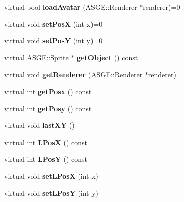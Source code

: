 \begin{DoxyCompactItemize}
\item 
\mbox{\label{class_object_a44005e232ebb49ea093dbf9fb909ef02}} 
virtual bool {\bfseries load\+Avatar} (A\+S\+G\+E\+::\+Renderer $\ast$renderer)=0
\item 
\mbox{\label{class_object_a81f5a535d599983bf95089b5e0837c94}} 
virtual void {\bfseries set\+PosX} (int x)=0
\item 
\mbox{\label{class_object_a9684d0c1fd87f92b71423f3615c830db}} 
virtual void {\bfseries set\+PosY} (int y)=0
\item 
\mbox{\label{class_object_a348ce852463ea723048518d2bd667d09}} 
virtual A\+S\+G\+E\+::\+Sprite $\ast$ {\bfseries get\+Object} () const
\item 
\mbox{\label{class_object_a7de1555915b05c5d3aac0c2e991c8cd3}} 
virtual void {\bfseries get\+Renderer} (A\+S\+G\+E\+::\+Renderer $\ast$renderer)
\item 
\mbox{\label{class_object_ae1bd233f42b7fbb51677e7ff570bf999}} 
virtual int {\bfseries get\+Posx} () const
\item 
\mbox{\label{class_object_ac501c5016fc527d03536120d78c1a693}} 
virtual int {\bfseries get\+Posy} () const
\item 
\mbox{\label{class_object_a8bd8af22c02e15929c9e5638f2d2bee3}} 
virtual void {\bfseries last\+XY} ()
\item 
\mbox{\label{class_object_a24a5d4e79c0c7c8599b19ffa68719bc2}} 
virtual int {\bfseries L\+PosX} () const
\item 
\mbox{\label{class_object_ac2e2ab5fb648563b3175fc5d338ebe35}} 
virtual int {\bfseries L\+PosY} () const
\item 
\mbox{\label{class_object_ab6014695762d40c4aed9ddea4c2e024a}} 
virtual void {\bfseries set\+L\+PosX} (int x)
\item 
\mbox{\label{class_object_a40d0051b240af9e48743984730f36fb7}} 
virtual void {\bfseries set\+L\+PosY} (int y)
\end{DoxyCompactItemize}
